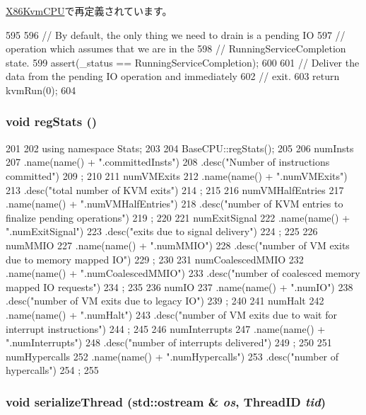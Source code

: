 \hyperlink{classX86KvmCPU_a405afc17ad0dee3b816012ce909b2b6f}{X86KvmCPU}で再定義されています。


\begin{DoxyCode}
595 {
596     // By default, the only thing we need to drain is a pending IO
597     // operation which assumes that we are in the
598     // RunningServiceCompletion state.
599     assert(_status == RunningServiceCompletion);
600 
601     // Deliver the data from the pending IO operation and immediately
602     // exit.
603     return kvmRun(0);
604 }
\end{DoxyCode}
\hypertarget{classBaseKvmCPU_a4dc637449366fcdfc4e764cdf12d9b11}{
\subsubsection[{regStats}]{\setlength{\rightskip}{0pt plus 5cm}void regStats ()}}
\label{classBaseKvmCPU_a4dc637449366fcdfc4e764cdf12d9b11}



\begin{DoxyCode}
201 {
202     using namespace Stats;
203 
204     BaseCPU::regStats();
205 
206     numInsts
207         .name(name() + ".committedInsts")
208         .desc("Number of instructions committed")
209         ;
210 
211     numVMExits
212         .name(name() + ".numVMExits")
213         .desc("total number of KVM exits")
214         ;
215 
216     numVMHalfEntries
217         .name(name() + ".numVMHalfEntries")
218         .desc("number of KVM entries to finalize pending operations")
219         ;
220 
221     numExitSignal
222         .name(name() + ".numExitSignal")
223         .desc("exits due to signal delivery")
224         ;
225 
226     numMMIO
227         .name(name() + ".numMMIO")
228         .desc("number of VM exits due to memory mapped IO")
229         ;
230 
231     numCoalescedMMIO
232         .name(name() + ".numCoalescedMMIO")
233         .desc("number of coalesced memory mapped IO requests")
234         ;
235 
236     numIO
237         .name(name() + ".numIO")
238         .desc("number of VM exits due to legacy IO")
239         ;
240 
241     numHalt
242         .name(name() + ".numHalt")
243         .desc("number of VM exits due to wait for interrupt instructions")
244         ;
245 
246     numInterrupts
247         .name(name() + ".numInterrupts")
248         .desc("number of interrupts delivered")
249         ;
250 
251     numHypercalls
252         .name(name() + ".numHypercalls")
253         .desc("number of hypercalls")
254         ;
255 }
\end{DoxyCode}
\hypertarget{classBaseKvmCPU_a688ca491f5419c29fb81f8235ba1dc13}{
\subsubsection[{serializeThread}]{\setlength{\rightskip}{0pt plus 5cm}void serializeThread (std::ostream \& {\em os}, \/  {\bf ThreadID} {\em tid})}}
\label{classBaseKvmCPU_a688ca491f5419c29fb81f8235ba1dc13}



